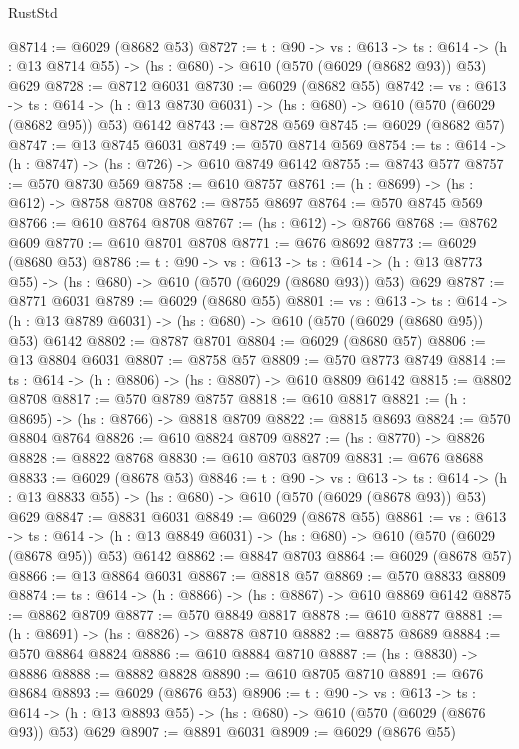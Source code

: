 \begin{lexlean}{RustStd}
\begin{coremodule}
@8714 := @6029 (@8682 @53)
@8727 := {t : @90} ->
  {vs : @613} ->
  {ts : @614} -> (h : @13 @8714 @55) -> (hs : @680) -> @610 (@570 (@6029 (@8682 @93)) @53) @629
@8728 := @8712 @6031
@8730 := @6029 (@8682 @55)
@8742 := {vs : @613} ->
  {ts : @614} -> (h : @13 @8730 @6031) -> (hs : @680) -> @610 (@570 (@6029 (@8682 @95)) @53) @6142
@8743 := @8728 @569
@8745 := @6029 (@8682 @57)
@8747 := @13 @8745 @6031
@8749 := @570 @8714 @569
@8754 := {ts : @614} -> (h : @8747) -> (hs : @726) -> @610 @8749 @6142
@8755 := @8743 @577
@8757 := @570 @8730 @569
@8758 := @610 @8757
@8761 := (h : @8699) -> (hs : @612) -> @8758 @8708
@8762 := @8755 @8697
@8764 := @570 @8745 @569
@8766 := @610 @8764 @8708
@8767 := (hs : @612) -> @8766
@8768 := @8762 @609
@8770 := @610 @8701 @8708
@8771 := @676 @8692
@8773 := @6029 (@8680 @53)
@8786 := {t : @90} ->
  {vs : @613} ->
  {ts : @614} -> (h : @13 @8773 @55) -> (hs : @680) -> @610 (@570 (@6029 (@8680 @93)) @53) @629
@8787 := @8771 @6031
@8789 := @6029 (@8680 @55)
@8801 := {vs : @613} ->
  {ts : @614} -> (h : @13 @8789 @6031) -> (hs : @680) -> @610 (@570 (@6029 (@8680 @95)) @53) @6142
@8802 := @8787 @8701
@8804 := @6029 (@8680 @57)
@8806 := @13 @8804 @6031
@8807 := @8758 @57
@8809 := @570 @8773 @8749
@8814 := {ts : @614} -> (h : @8806) -> (hs : @8807) -> @610 @8809 @6142
@8815 := @8802 @8708
@8817 := @570 @8789 @8757
@8818 := @610 @8817
@8821 := (h : @8695) -> (hs : @8766) -> @8818 @8709
@8822 := @8815 @8693
@8824 := @570 @8804 @8764
@8826 := @610 @8824 @8709
@8827 := (hs : @8770) -> @8826
@8828 := @8822 @8768
@8830 := @610 @8703 @8709
@8831 := @676 @8688
@8833 := @6029 (@8678 @53)
@8846 := {t : @90} ->
  {vs : @613} ->
  {ts : @614} -> (h : @13 @8833 @55) -> (hs : @680) -> @610 (@570 (@6029 (@8678 @93)) @53) @629
@8847 := @8831 @6031
@8849 := @6029 (@8678 @55)
@8861 := {vs : @613} ->
  {ts : @614} -> (h : @13 @8849 @6031) -> (hs : @680) -> @610 (@570 (@6029 (@8678 @95)) @53) @6142
@8862 := @8847 @8703
@8864 := @6029 (@8678 @57)
@8866 := @13 @8864 @6031
@8867 := @8818 @57
@8869 := @570 @8833 @8809
@8874 := {ts : @614} -> (h : @8866) -> (hs : @8867) -> @610 @8869 @6142
@8875 := @8862 @8709
@8877 := @570 @8849 @8817
@8878 := @610 @8877
@8881 := (h : @8691) -> (hs : @8826) -> @8878 @8710
@8882 := @8875 @8689
@8884 := @570 @8864 @8824
@8886 := @610 @8884 @8710
@8887 := (hs : @8830) -> @8886
@8888 := @8882 @8828
@8890 := @610 @8705 @8710
@8891 := @676 @8684
@8893 := @6029 (@8676 @53)
@8906 := {t : @90} ->
  {vs : @613} ->
  {ts : @614} -> (h : @13 @8893 @55) -> (hs : @680) -> @610 (@570 (@6029 (@8676 @93)) @53) @629
@8907 := @8891 @6031
@8909 := @6029 (@8676 @55)

\end{coremodule}
\end{lexlean}
